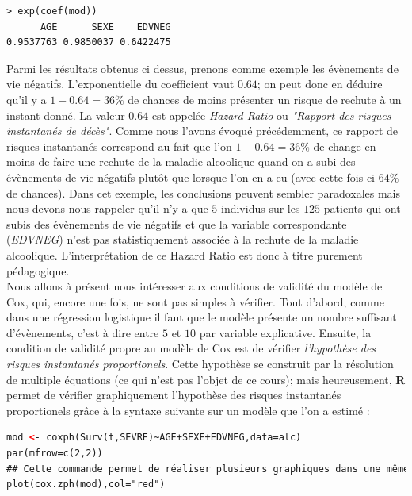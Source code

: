 \begin{lstlisting}[language=html]
> exp(coef(mod))
      AGE      SEXE    EDVNEG 
0.9537763 0.9850037 0.6422475 
\end{lstlisting}

Parmi les résultats obtenus ci dessus, prenons comme exemple les évènements de vie négatifs. L'exponentielle du coefficient vaut $0.64$; on peut donc en déduire qu'il y a $1-0.64 = 36\%$ de chances de moins présenter un risque de rechute à un instant donné. La valeur $0.64$ est appelée \textit{Hazard Ratio} ou \textit{"Rapport des risques instantanés de décès"}. Comme nous l'avons évoqué précédemment, ce rapport de risques instantanés correspond au fait que l'on $1-0.64 = 36\%$ de change en moins de faire une rechute de la maladie alcoolique quand on a subi des évènements de vie négatifs plutôt que lorsque l'on en a eu (avec cette fois ci $64\%$ de chances).\newline
Dans cet exemple, les conclusions peuvent sembler paradoxales mais nous devons nous rappeler qu'il n'y a que $5$ individus sur les $125$ patients qui ont subis des évènements de vie négatifs et que la variable correspondante (\textit{EDVNEG}) n'est pas statistiquement associée à la rechute de la maladie alcoolique. L'interprétation de ce Hazard Ratio est donc à titre purement pédagogique.\newline 
\\
Nous allons à présent nous intéresser aux conditions de validité du modèle de Cox, qui, encore une fois, ne sont pas simples à vérifier.\newline
Tout d'abord, comme dans une régression logistique il faut que le modèle présente un nombre suffisant d'évènements, c'est à dire entre $5$ et $10$ par variable explicative.
Ensuite, la condition de validité propre au modèle de Cox est de vérifier \textit{l'hypothèse des risques instantanés proportionels}. Cette hypothèse se construit par la résolution de multiple équations (ce qui n'est pas l'objet de ce cours); mais heureusement, \textbf{R} permet de vérifier graphiquement l'hypothèse des risques instantanés proportionels grâce à la syntaxe suivante sur un modèle que l'on a estimé : 

\begin{lstlisting}[language=html]
mod <- coxph(Surv(t,SEVRE)~AGE+SEXE+EDVNEG,data=alc)
par(mfrow=c(2,2))
## Cette commande permet de réaliser plusieurs graphiques dans une même fenêtre -- Partition de la fenêtre en 2x2 celulles
plot(cox.zph(mod),col="red")
\end{lstlisting}

